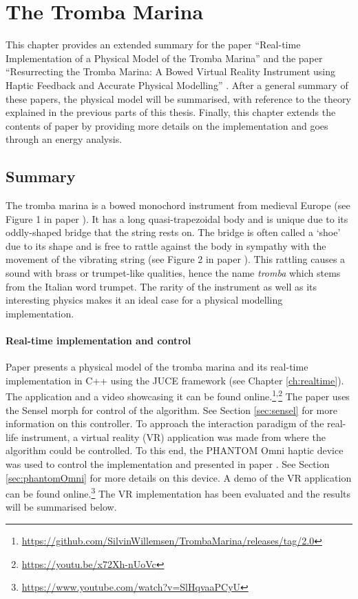 \chapter{The Tromba Marina}\label{ch:tromba}
This chapter provides an extended summary for the paper ``Real-time Implementation of a Physical Model of the Tromba Marina'' \citeP[D] and the paper ``Resurrecting the Tromba Marina: A Bowed Virtual Reality Instrument using Haptic Feedback and Accurate Physical Modelling'' \citeP[E]. After a general summary of these papers, the physical model will be summarised, with reference to the theory explained in the previous parts of this thesis. Finally, this chapter extends the contents of paper \citeP[D] by providing more details on the implementation and goes through an energy analysis.

\section{Summary}
The tromba marina is a bowed monochord instrument from medieval Europe (see Figure 1 in paper \citeP[D]). It has a long quasi-trapezoidal body and is unique due to its oddly-shaped bridge that the string rests on. The bridge is often called a `shoe' due to its shape and is free to rattle against the body in sympathy with the movement of the vibrating string (see Figure 2 in paper \citeP[D]). This rattling causes a sound with brass or trumpet-like qualities, hence the name \textit{tromba} which stems from the Italian word trumpet. The rarity of the instrument as well as its interesting physics makes it an ideal case for a physical modelling implementation.

\subsubsection{Real-time implementation and control}
Paper \citeP[D] presents a physical model of the tromba marina and its real-time implementation in C++ using the JUCE framework (see Chapter \ref{ch:realtime}). The application and a video showcasing it can be found online.\footnote{\url{https://github.com/SilvinWillemsen/TrombaMarina/releases/tag/2.0}}\textsuperscript{,}\footnote{\url{https://youtu.be/x72Xh-nUoVc}} The paper uses the Sensel morph for control of the algorithm. See Section \ref{sec:sensel} for more information on this controller. To approach the interaction paradigm of the real-life instrument, a virtual reality (VR) application was made from where the algorithm could be controlled. To this end, the PHANTOM Omni haptic device was used to control the implementation and presented in paper \citeP[E]. See Section \ref{sec:phantomOmni} for more details on this device. A demo of the VR application can be found  online.\footnote{\url{https://www.youtube.com/watch?v=SlHqvaaPCyU}} The VR implementation has been evaluated and the results will be summarised below.

